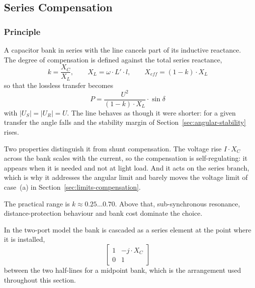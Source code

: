 \subsection{Series Compensation}
\label{sec:series-compensation}

\subsubsection{Principle}
\label{sec:sc-principle}

A capacitor bank in series with the line cancels part of its inductive
reactance. The degree of compensation is defined against the total series
reactance,
\begin{equation}
  k = \frac{X_C}{X_L},
  \qquad X_L = \omega \cdot L' \cdot l,
  \qquad X_{eff} = \left(1-k\right) \cdot X_L
  \label{eq:sc-k}
\end{equation}
so that the lossless transfer becomes
\begin{equation}
  P = \frac{U^2}{\left(1-k\right) \cdot X_L} \cdot \sin\delta
  \label{eq:sc-power}
\end{equation}
with $\left|U_S\right| = \left|U_R\right| = U$. The line behaves as though
it were shorter: for a given transfer the angle falls and the stability
margin of Section~\ref{sec:angular-stability} rises.

Two properties distinguish it from shunt compensation. The voltage rise
$I \cdot X_C$ across the bank scales with the current, so the compensation
is self-regulating: it appears when it is needed and not at light load. And
it acts on the series branch, which is why it addresses the angular limit
and barely moves the voltage limit of case~(a) in
Section~\ref{sec:limits-compensation}.

The practical range is $k \approx 0.25 \ldots 0.70$. Above that,
sub-synchronous resonance, distance-protection behaviour and bank cost
dominate the choice.

In the two-port model the bank is cascaded as a series element at the point
where it is installed,
\begin{equation}
  \begin{bmatrix} 1 & -j \cdot X_C \\ 0 & 1 \end{bmatrix}
  \label{eq:sc-twoport}
\end{equation}
between the two half-lines for a midpoint bank, which is the arrangement
used throughout this section.

